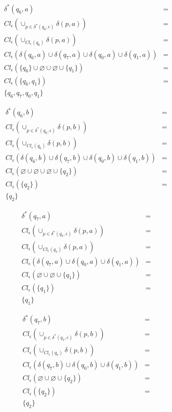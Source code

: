 \documentclass{article}
\begin{document}
\begin{enumerate}
{\begin{enumerate}
{					\begin{align*}
					\delta^{*} (q_{6},a)&=\\
					Cl_{\epsilon} (\cup_{p \in \delta^{*} (q_{6}, \epsilon)}	\delta (p,a)) &=\\
					Cl_{\epsilon} (\cup_{Cl_{\epsilon} (q_{6})}	\delta (p,a)) &=\\
					Cl_{\epsilon} ( \delta(q_{6},a) \cup \delta(q_{7},a) \cup \delta(q_{0},a) \cup \delta(q_{1},a)) &=\\
					Cl_{\epsilon} ( \{q_{6}\} \cup \varnothing \cup \varnothing \cup \{q_{1}\}) &=\\
					Cl_{\epsilon} (\{q_{6}, q_{1}\}) &=\\
					\{q_{6}, q_{7}, q_{0}, q_{1}\}
					\end{align*}
					
					\begin{align*}
					\delta^{*} (q_{6},b)&=\\
					Cl_{\epsilon} (\cup_{p \in \delta^{*} (q_{6}, \epsilon)}	\delta (p,b)) &=\\
					Cl_{\epsilon} (\cup_{Cl_{\epsilon} (q_{6})}	\delta (p,b)) &=\\
					Cl_{\epsilon} ( \delta(q_{6},b) \cup \delta(q_{7},b) \cup \delta(q_{0},b) \cup \delta(q_{1},b)) &=\\
					Cl_{\epsilon} ( \varnothing \cup \varnothing \cup \varnothing \cup \{q_{2}\}) &=\\
					Cl_{\epsilon} (\{q_{2}\}) &=\\
					\{q_{2}\}
					\end{align*}
					
					\begin{align*}
					\delta^{*} (q_{7},a)&=\\
					Cl_{\epsilon} (\cup_{p \in \delta^{*} (q_{7}, \epsilon)}	\delta (p,a)) &=\\
					Cl_{\epsilon} (\cup_{Cl_{\epsilon} (q_{7})}	\delta (p,a)) &=\\
					Cl_{\epsilon} ( \delta(q_{7},a) \cup \delta(q_{0},a) \cup \delta(q_{1},a)) &=\\
					Cl_{\epsilon} (\varnothing \cup \varnothing \cup \{q_{1}\}) &=\\
					Cl_{\epsilon} (\{q_{1}\}) &=\\
					\{q_{1}\}
					\end{align*}
					
					\begin{align*}
					\delta^{*} (q_{7},b)&=\\
					Cl_{\epsilon} (\cup_{p \in \delta^{*} (q_{7}, \epsilon)}	\delta (p,b)) &=\\
					Cl_{\epsilon} (\cup_{Cl_{\epsilon} (q_{7})}	\delta (p,b)) &=\\
					Cl_{\epsilon} ( \delta(q_{7},b) \cup \delta(q_{0},b) \cup \delta(q_{1},b)) &=\\
					Cl_{\epsilon} ( \varnothing \cup \varnothing \cup \{q_{2}\}) &=\\
					Cl_{\epsilon} (\{q_{2}\}) &=\\
					\{q_{2}\}
					\end{align*}
					
}
\end{enumerate}}
\end{enumerate}
\end{document}
